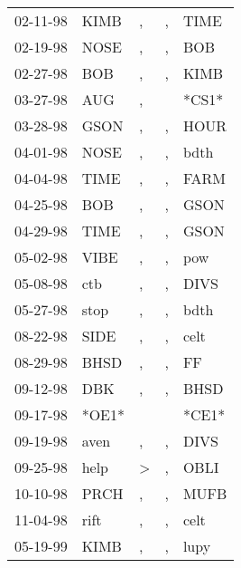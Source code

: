 \begin{supertabular}{lllll}
 02-11-98 &   KIMB &             , &  , &   TIME \\
 02-19-98 &   NOSE &             , &  , &    BOB \\
 02-27-98 &    BOB &             , &  , &   KIMB \\
 03-27-98 &    AUG &             , &    &  *CS1* \\
 03-28-98 &   GSON &             , &  , &   HOUR \\
 04-01-98 &   NOSE &             , &  , &   bdth \\
 04-04-98 &   TIME &             , &  , &   FARM \\
 04-25-98 &    BOB &             , &  , &   GSON \\
 04-29-98 &   TIME &             , &  , &   GSON \\
 05-02-98 &   VIBE &             , &  , &    pow \\
 05-08-98 &    ctb &             , &  , &   DIVS \\
 05-27-98 &   stop &             , &  , &   bdth \\
 08-22-98 &   SIDE &             , &  , &   celt \\
 08-29-98 &   BHSD &             , &  , &     FF \\
 09-12-98 &    DBK &             , &  , &   BHSD \\
 09-17-98 &  *OE1* &               &    &  *CE1* \\
 09-19-98 &   aven &             , &  , &   DIVS \\
 09-25-98 &   help &  \textgreater &  , &   OBLI \\
 10-10-98 &   PRCH &             , &  , &   MUFB \\
 11-04-98 &   rift &             , &  , &   celt \\
 05-19-99 &   KIMB &             , &  , &   lupy \\
\end{supertabular}
